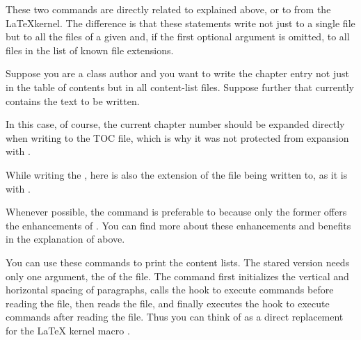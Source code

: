 \begin{Declaration}
\end{Declaration}
These two commands are directly related to
explained above, or to  from the \LaTeX kernel. The
difference is that these statements write  not just to a single
file but to all the files of a given  and, if the first optional
argument is omitted, to all files in the list of known file extensions.
\begin{Example}
  Suppose you are a class author and you want to write the chapter entry not
  just in the table of contents but in all content-list files. Suppose further
  that  currently contains the text to be written.
  In this case, of course, the current chapter number should be expanded
  directly when writing to the TOC file, which is why it was not protected
  from expansion with .
\end{Example}
While writing the ,
 here is also
the extension of the file being written to, as it is with
.%

Whenever possible, the
 command is preferable to
 because only the former offers the
enhancements of . You can find more
about these enhancements and benefits in the explanation of
 above.%
%
\EndIndexGroup


\begin{Declaration}
\end{Declaration}
You can use these commands to print the content lists.
The stared version  needs only
one argument, the  of the file. The command first initializes
the vertical and horizontal spacing of paragraphs, calls the hook to execute
commands before reading the file, then reads the file, and finally executes
the hook to execute commands after reading the file. Thus you can think of
 as a direct replacement for the \LaTeX{} kernel macro
.

